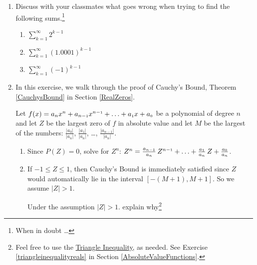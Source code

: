 \documentclass{ximera}
\begin{document}
\begin{enumerate}
\item  Discuss with your classmates what goes wrong when trying to find the following sums.\footnote{When in doubt \ldots }



\begin{multicols}{3}
\begin{enumerate}

\item  $\displaystyle{ \sum_{k=1}^{\infty} 2^{k-1}}$


\item  $\displaystyle{ \sum_{k=1}^{\infty} (1.0001)^{k-1}}$

\item  $\displaystyle{ \sum_{k=1}^{\infty} (-1)^{k-1}}$

\end{enumerate}
\end{multicols}



\item  \label{CauchyBoundProofExercise}  In this exercise, we walk through the proof of Cauchy's Bound, Theorem \ref{CauchysBound} in Section \ref{RealZeros}.  

\smallskip

Let $f(x) = a_{n} x^{n} + a_{n-\mbox{\tiny$1$}}x^{n-\mbox{\tiny$1$}} + \ldots + a_{\mbox{\tiny$1$}} x + a_{\mbox{\tiny$0$}}$ be a polynomial of degree $n$ and let $Z$ be the largest zero of $f$ in absolute value and let $M$ be the largest of the numbers: $\frac{|a_{0}|}{|a_{n}|}$, $\frac{|a_{1}|}{|a_{n}|}$, \ldots, $\frac{|a_{n-1}|}{|a_{n}|}$.

\begin{enumerate}

\item  Since $P(Z) = 0$, solve for $Z^{n}$:   $Z^{n} = \frac{a_{n-\mbox{\tiny$1$}}}{a_{n}} \, Z^{n-\mbox{\tiny$1$}} + \ldots + \frac{a_{\mbox{\tiny$1$}}}{a_{n}} \,  Z + \frac{a_{\mbox{\tiny$0$}}}{a_{n}}$.

\item  If $-1 \leq Z \leq 1$, then Cauchy's Bound is immediately satisfied since $Z$ would automatically lie in the interval $\left[-(M+1), M+1\right]$. So we assume $|Z|>1$.  

\smallskip

Under the assumption $|Z|>1$. explain why\footnote{Feel free to use the \href{http://en.wikipedia.org/wiki/Triangle_inequality}{\underline{Triangle Inequality}}, as needed.  See Exercise \ref{triangleinequalityreals} in Section \ref{AbsoluteValueFunctions}.} 


\end{enumerate}
\end{enumerate}
\end{document}
